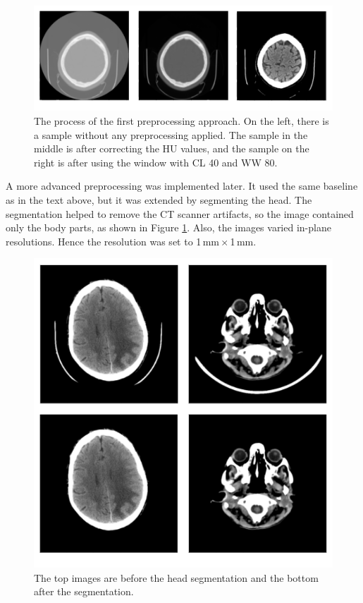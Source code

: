 \documentclass[thesis=B,english]{FITthesis}[2019/12/23]
\begin{document}
\begin{figure}[ht]
		\includegraphics[scale=1.55]{images/correcting_HU.png}
		\centering
		\caption{The process of the first preprocessing approach. On the left, there is a sample without any preprocessing applied. The sample in the middle is after correcting the HU values, and the sample on the right is after using the window with CL 40 and WW 80.}
\end{figure}

A more advanced preprocessing was implemented later. It used the same baseline as in the text above, but it was extended by segmenting the head. The segmentation helped to remove the CT scanner artifacts, so the image contained only the body parts, as shown in Figure \ref{fig:brain_segmentation}. Also, the images varied in-plane resolutions. Hence the resolution was set to 1\,mm\,$\times$\,1\,mm.

\begin{figure}[ht]
		\includegraphics[scale=2.3]{images/image_segmentation.png}
		\centering
		\caption{The top images are before the head segmentation and the bottom after the segmentation.}
		\label{fig:brain_segmentation}
\end{figure}
\end{document}
